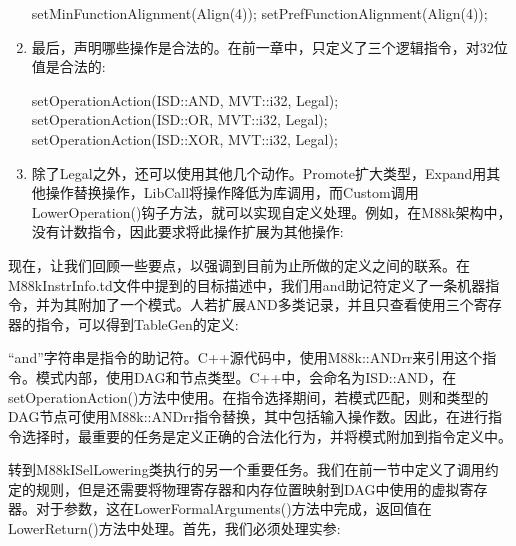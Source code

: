 \begin{enumerate}
\begin{cpp}
setMinFunctionAlignment(Align(4));
setPrefFunctionAlignment(Align(4));
\end{cpp}

\item
最后，声明哪些操作是合法的。在前一章中，只定义了三个逻辑指令，对32位值是合法的:

\begin{cpp}
setOperationAction(ISD::AND, MVT::i32, Legal);
setOperationAction(ISD::OR, MVT::i32, Legal);
setOperationAction(ISD::XOR, MVT::i32, Legal);
\end{cpp}

\item
除了Legal之外，还可以使用其他几个动作。Promote扩大类型，Expand用其他操作替换操作，LibCall将操作降低为库调用，而Custom调用LowerOperation()钩子方法，就可以实现自定义处理。例如，在M88k架构中，没有计数指令，因此要求将此操作扩展为其他操作:

\begin{cpp}
    setOperationAction(ISD::CTPOP, MVT::i32, Expand);
}
\end{cpp}
\end{enumerate}

现在，让我们回顾一些要点，以强调到目前为止所做的定义之间的联系。在M88kInstrInfo.td文件中提到的目标描述中，我们用and助记符定义了一条机器指令，并为其附加了一个模式。人若扩展AND多类记录，并且只查看使用三个寄存器的指令，可以得到TableGen的定义:


“and”字符串是指令的助记符。C++源代码中，使用M88k::ANDrr来引用这个指令。模式内部，使用DAG和节点类型。C++中，会命名为ISD::AND，在setOperationAction()方法中使用。在指令选择期间，若模式匹配，则和类型的DAG节点可使用M88k::ANDrr指令替换，其中包括输入操作数。因此，在进行指令选择时，最重要的任务是定义正确的合法化行为，并将模式附加到指令定义中。


转到M88kISelLowering类执行的另一个重要任务。我们在前一节中定义了调用约定的规则，但是还需要将物理寄存器和内存位置映射到DAG中使用的虚拟寄存器。对于参数，这在LowerFormalArguments()方法中完成，返回值在LowerReturn()方法中处理。首先，我们必须处理实参:

